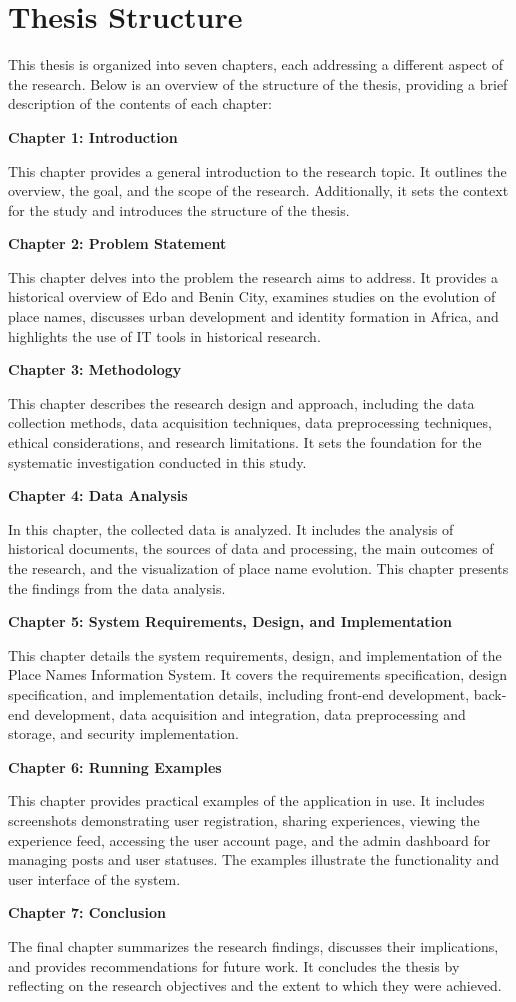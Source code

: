 \section{Thesis Structure}

This thesis is organized into seven chapters, each addressing a different aspect of the research. Below is an overview of the structure of the thesis, providing a brief description of the contents of each chapter:

\textbf{Chapter 1: Introduction}

This chapter provides a general introduction to the research topic. It outlines the overview, the goal, and the scope of the research. Additionally, it sets the context for the study and introduces the structure of the thesis.

\textbf{Chapter 2: Problem Statement}

This chapter delves into the problem the research aims to address. It provides a historical overview of Edo and Benin City, examines studies on the evolution of place names, discusses urban development and identity formation in Africa, and highlights the use of IT tools in historical research.

\textbf{Chapter 3: Methodology}

This chapter describes the research design and approach, including the data collection methods, data acquisition techniques, data preprocessing techniques, ethical considerations, and research limitations. It sets the foundation for the systematic investigation conducted in this study.

\textbf{Chapter 4: Data Analysis}

In this chapter, the collected data is analyzed. It includes the analysis of historical documents, the sources of data and processing, the main outcomes of the research, and the visualization of place name evolution. This chapter presents the findings from the data analysis.

\textbf{Chapter 5: System Requirements, Design, and Implementation}

This chapter details the system requirements, design, and implementation of the Place Names Information System. It covers the requirements specification, design specification, and implementation details, including front-end development, back-end development, data acquisition and integration, data preprocessing and storage, and security implementation.

\textbf{Chapter 6: Running Examples}

This chapter provides practical examples of the application in use. It includes screenshots demonstrating user registration, sharing experiences, viewing the experience feed, accessing the user account page, and the admin dashboard for managing posts and user statuses. The examples illustrate the functionality and user interface of the system.

\textbf{Chapter 7: Conclusion}

The final chapter summarizes the research findings, discusses their implications, and provides recommendations for future work. It concludes the thesis by reflecting on the research objectives and the extent to which they were achieved.
